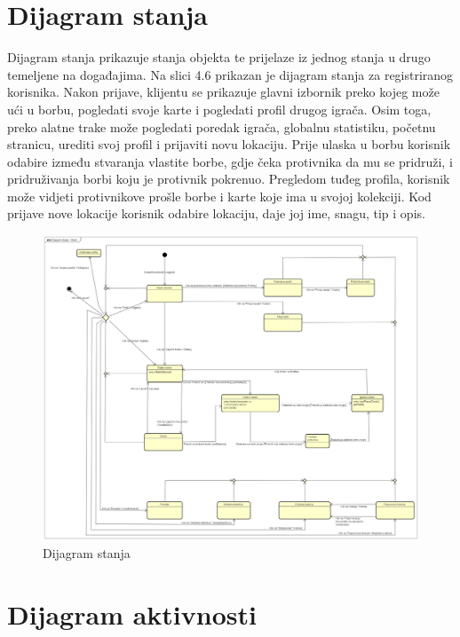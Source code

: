 \begin{itemize}
		\section{Dijagram stanja}
		Dijagram stanja prikazuje stanja objekta te prijelaze iz jednog stanja u drugo temeljene na događajima. Na slici 4.6 prikazan je dijagram stanja za registriranog korisnika. Nakon prijave, klijentu se prikazuje glavni izbornik preko kojeg može ući u borbu, pogledati svoje karte i pogledati profil drugog igrača. Osim toga, preko alatne trake može pogledati poredak igrača, globalnu statistiku, početnu stranicu, urediti svoj profil i prijaviti novu lokaciju. Prije ulaska u borbu korisnik odabire između stvaranja vlastite borbe, gdje čeka protivnika da mu se pridruži, i pridruživanja borbi koju je protivnik pokrenuo. Pregledom tuđeg profila, korisnik može vidjeti protivnikove prošle borbe i karte koje ima u svojoj kolekciji. Kod prijave nove lokacije korisnik odabire lokaciju, daje joj ime, snagu, tip i opis.
		\begin{figure}[H]
			\includegraphics[width=\textwidth]{slike/Dijagram_stanja_-_Klijent.png}
			\centering
			\caption{Dijagram stanja}
			\label{fig:promjene}
		\end{figure}

		\eject

		\section{Dijagram aktivnosti}


\end{itemize}
